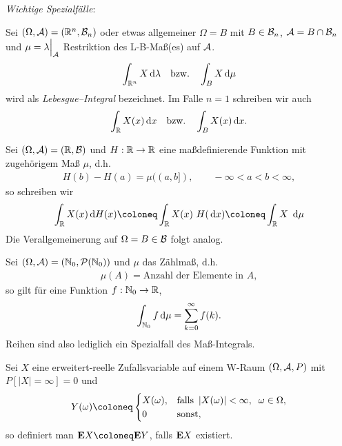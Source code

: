 \begin{bem}
\begin{bemenum}
\textit{Wichtige Spezialfälle}:
\begin{defnenum}
\item
Sei $(\Omega, \AA) = (\R^{n}, {\BB}_{n})$ oder etwas allgemeiner
$\Omega = B$ mit $B \in {\BB}_{n}$,  $\AA = B\cap \BB_n$ und $\mu =
\lambda\Big|_{\AA}$ Restriktion des L-B-Maß(es) auf $\AA$.
\begin{align*}
\int_{\R^{n}}X\dlambda\quad \text{bzw.} \quad \int_{B} X\dmu
\end{align*}
wird als \emph{Lebesgue--Integral} bezeichnet.
Im Falle $n=1$ schreiben wir auch
\begin{align*}
\int_{\R}X(x)\dx \quad \text{bzw.} \quad \int_{B} X(x)\dx.
\end{align*}
\item
Sei $(\Omega,\AA)= (\R, {\BB})$ und $H: \R \to \R$ eine maßdefinierende Funktion
mit zugehörigem Maß $\mu$, d.h.
\begin{align*}
H(b)-H(a) = \mu ((a,b]),\qquad -\infty< a <b < \infty,
\end{align*}
so schreiben wir
\begin{align*}
\int_{\R} X(x)\dH(x) \defl \int_{\R} X(x)\ H(\dx)\defl
\int_{\R} X\ \dmu
\end{align*}
Die Verallgemeinerung auf $\Omega = B \in {\BB}$ folgt analog.
\item Sei $(\Omega,\AA)=(\N_0,\PP(\N_0))$ und $\mu$ das Zählmaß, d.h.
\begin{align*}
\mu(A) = \text{Anzahl der Elemente in }A,
\end{align*}
so gilt für eine Funktion $f:\N_0\to\R$,
\begin{align*}
\int_{\N_0} f\dmu = \sum\limits_{k=0}^\infty f(k).
\end{align*}
Reihen sind also lediglich ein Spezialfall des Maß-Integrals.
\end{defnenum}
\item\label{bem:4.1:5}
Sei $X$ eine erweitert-reelle Zufallsvariable auf einem W-Raum $(\Omega,
\AA,P)$ mit $P[|X| = \infty] = 0$ und
\begin{align*}
Y(\omega ) \defl
\begin{cases}
X(\omega),& \text{falls } \abs{X(\omega)} < \infty, \; \; \omega \in \Omega,\\
0 & \text{sonst},
\end{cases}
\end{align*}
so definiert man $\E X\defl \E Y$, falls $\E X$ existiert. 
\maphere
\end{bemenum}
\end{bem}


